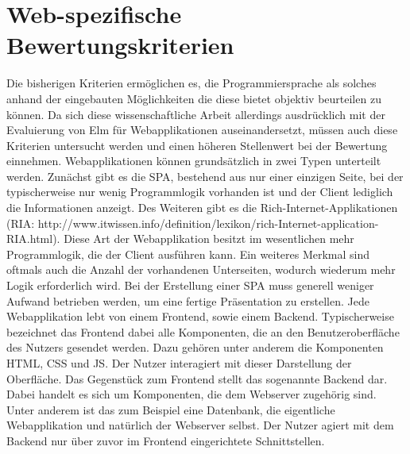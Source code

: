 \section{Web-spezifische Bewertungskriterien}
\label{sec:web-kriterien}
Die bisherigen Kriterien ermöglichen es, die Programmiersprache als solches anhand der eingebauten Möglichkeiten die diese bietet objektiv beurteilen zu können. Da sich diese wissenschaftliche Arbeit allerdings ausdrücklich mit der Evaluierung von Elm für Webapplikationen auseinandersetzt, müssen auch diese Kriterien untersucht werden und einen höheren Stellenwert bei der Bewertung einnehmen.
Webapplikationen können grundsätzlich in zwei Typen unterteilt werden. Zunächst gibt es die \ac{SPA}, bestehend aus nur einer einzigen Seite, bei der typischerweise nur wenig  Programmlogik vorhanden ist und der Client lediglich die Informationen anzeigt. Des Weiteren gibt es die Rich-Internet-Applikationen\\
(RIA: http://www.itwissen.info/definition/lexikon/rich-Internet-application-RIA.html). Diese Art der Webapplikation besitzt im wesentlichen mehr Programmlogik, die der Client ausführen kann. Ein weiteres Merkmal sind oftmals auch die Anzahl der vorhandenen Unterseiten, wodurch wiederum mehr Logik erforderlich wird.
Bei der Erstellung einer \ac{SPA} muss generell weniger Aufwand betrieben werden, um eine fertige Präsentation zu erstellen.
Jede Webapplikation lebt von einem Frontend, sowie einem Backend. Typischerweise bezeichnet das Frontend dabei alle Komponenten, die an den Benutzeroberfläche des Nutzers gesendet werden. Dazu gehören unter anderem die Komponenten \ac{HTML}, \ac{CSS} und \ac{JS}. Der Nutzer interagiert mit dieser Darstellung der Oberfläche.
Das Gegenstück zum Frontend stellt das sogenannte Backend dar. Dabei handelt es sich um Komponenten, die dem Webserver zugehörig sind. Unter anderem ist das zum Beispiel eine Datenbank, die eigentliche Webapplikation und natürlich der Webserver selbst. Der Nutzer agiert mit dem Backend nur über zuvor im Frontend eingerichtete Schnittstellen.


